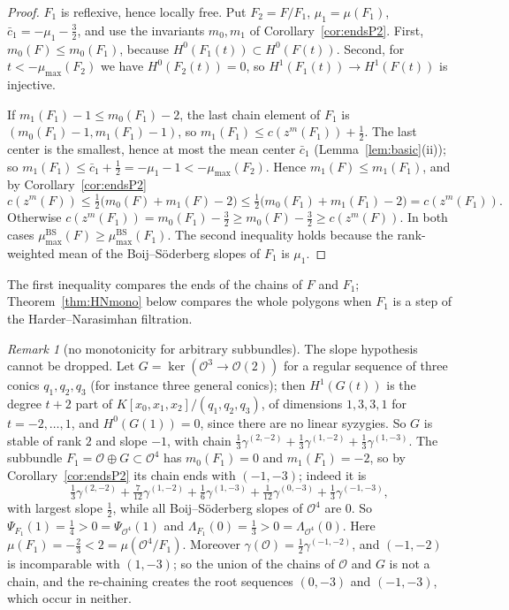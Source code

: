 \documentclass[11pt]{amsart}
\theoremstyle{definition}
\theoremstyle{remark}
\newtheorem{remark}[theorem]{Remark}
\newcommand{\OO}{\mathcal{O}}
\newcommand{\BS}{\mathrm{BS}}
\begin{document}
\begin{proof}
$F_1$ is reflexive, hence locally free. Put $F_2=F/F_1$, $\mu_1=\mu(F_1)$, $\bar c_1=-\mu_1-\frac32$, and use the invariants $m_0,m_1$ of Corollary~\ref{cor:endsP2}. First, $m_0(F)\le m_0(F_1)$, because $H^0(F_1(t))\subset H^0(F(t))$. Second, for $t<-\mu_{\max}(F_2)$ we have $H^0(F_2(t))=0$, so $H^1(F_1(t))\to H^1(F(t))$ is injective.

If $m_1(F_1)-1\le m_0(F_1)-2$, the last chain element of $F_1$ is $(m_0(F_1)-1,m_1(F_1)-1)$, so $m_1(F_1)\le c(z^m(F_1))+\frac12$. The last center is the smallest, hence at most the mean center $\bar c_1$ (Lemma~\ref{lem:basic}(ii)); so $m_1(F_1)\le \bar c_1+\frac12=-\mu_1-1<-\mu_{\max}(F_2)$. Hence $m_1(F)\le m_1(F_1)$, and by Corollary~\ref{cor:endsP2}
\[
c(z^m(F))\le\tfrac12\big(m_0(F)+m_1(F)-2\big)\le\tfrac12\big(m_0(F_1)+m_1(F_1)-2\big)=c(z^m(F_1)).
\]
Otherwise $c(z^m(F_1))=m_0(F_1)-\frac32\ge m_0(F)-\frac32\ge c(z^m(F))$. In both cases $\mu^\BS_{\max}(F)\ge\mu^\BS_{\max}(F_1)$. The second inequality holds because the rank-weighted mean of the Boij--Söderberg slopes of $F_1$ is $\mu_1$.
\end{proof}

The first inequality compares the ends of the chains of $F$ and $F_1$; Theorem~\ref{thm:HNmono} below compares the whole polygons when $F_1$ is a step of the Harder--Narasimhan filtration.

\begin{remark}[no monotonicity for arbitrary subbundles]\label{rem:nomono}
The slope hypothesis cannot be dropped. Let $G=\ker(\OO^3\to\OO(2))$ for a regular sequence of three conics $q_1,q_2,q_3$ (for instance three general conics); then $H^1(G(t))$ is the degree $t+2$ part of $K[x_0,x_1,x_2]/(q_1,q_2,q_3)$, of dimensions $1,3,3,1$ for $t=-2,\dots,1$, and $H^0(G(1))=0$, since there are no linear syzygies. So $G$ is stable of rank $2$ and slope $-1$, with chain $\frac13\gamma^{(2,-2)}+\frac13\gamma^{(1,-2)}+\frac13\gamma^{(1,-3)}$. The subbundle $F_1=\OO\oplus G\subset\OO^4$ has $m_0(F_1)=0$ and $m_1(F_1)=-2$, so by Corollary~\ref{cor:endsP2} its chain ends with $(-1,-3)$; indeed it is
\[
\tfrac13\gamma^{(2,-2)}+\tfrac7{12}\gamma^{(1,-2)}+\tfrac16\gamma^{(1,-3)}+\tfrac1{12}\gamma^{(0,-3)}+\tfrac13\gamma^{(-1,-3)},
\]
with largest slope $\frac12$, while all Boij--Söderberg slopes of $\OO^4$ are $0$. So $\Psi_{F_1}(1)=\frac14>0=\Psi_{\OO^4}(1)$ and $\Lambda_{F_1}(0)=\frac13>0=\Lambda_{\OO^4}(0)$. Here $\mu(F_1)=-\frac23<2=\mu(\OO^4/F_1)$. Moreover $\gamma(\OO)=\frac12\gamma^{(-1,-2)}$, and $(-1,-2)$ is incomparable with $(1,-3)$; so the union of the chains of $\OO$ and $G$ is not a chain, and the re-chaining creates the root sequences $(0,-3)$ and $(-1,-3)$, which occur in neither.
\end{remark}
\end{document}
